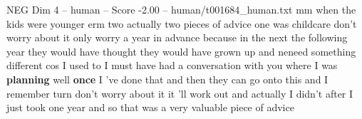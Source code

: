 \begin{textsample}{NEG Dim 4 – human – Score -2.00 – human/t001684\_human.txt}  \label{ex:f4_neg_032}
mm when the kids were younger erm two actually two pieces of advice one was childcare don't worry about it only worry a year in advance because in the next the following year they would have thought they would have grown up and neneed something different cos I used to I must have had a conversation with you where I was \textbf{planning} well \textbf{once} I 've done that and then they can go onto this and I remember turn don't worry about it it 'll work out and actually I didn't after I just took one year and so that was a very valuable piece of advice

\end{textsample}
